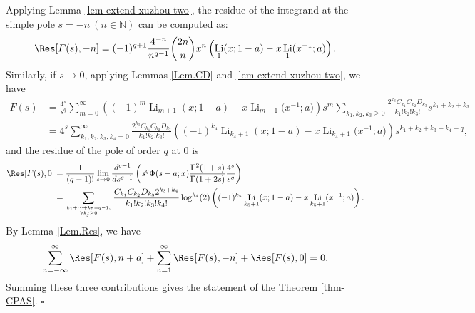 \documentclass[11pt]{article}
\DeclareMathOperator{\Li}{Li}
\def\N{\mathbb{N}}
\theoremstyle{plain}
\theoremstyle{definition}
\begin{document}
Applying Lemma \ref{lem-extend-xuzhou-two}, the residue of the integrand at the simple pole $s=-n\ (n\in\N)$ can be computed as:
\begin{align*}
\Res[F(s),-n]=(-1)^{q+1}\frac{4^{-n}}{n^{q-1}}\binom{2n}{n}x^n\left(\Li_1(x;1-a)-x\Li_1(x^{-1};a)\right).
\end{align*}
Similarly, if $s\to 0$, applying Lemmas \ref{Lem.CD} and \ref{lem-extend-xuzhou-two}, we have
\begin{align*}
F(s)&=\frac{4^s}{s^q}\sum_{m=0}^\infty \left((-1)^m \Li_{m+1}(x;1-a)-x \Li_{m+1}\Big(x^{-1};a\Big) \right)s^m \sum_{k_1,k_2,k_3\geq0}
    \frac{2^{k_3}C_{k_1}C_{k_2}D_{k_3}}{k_1!k_2!k_3!}s^{k_1+k_2+k_3}\\
    &=4^s\sum_{k_1,k_2,k_3,k_4=0}^\infty \frac{2^{k_3}C_{k_1}C_{k_2}D_{k_3}}{k_1!k_2!k_3!}\left((-1)^{k_4} \Li_{k_4+1}(x;1-a)-x \Li_{k_4+1}\Big(x^{-1};a\Big) \right)s^{k_1+k_2+k_3+k_4-q},
\end{align*}
and the residue of the pole of order $q$ at 0 is
\begin{align*}
\Res[F(s),0]&=\frac1{(q-1)!}\lim_{s\rightarrow 0}\frac{d^{q-1}}{ds^{q-1}}\left(s^q\Phi(s-a;x) \frac{\Gamma^2(1+s)}{\Gamma(1+2s)}\frac{4^s}{s^q}\right)\\
&=\sum_{k_1+\cdots+k_5=q-1,\atop \forall k_j\geq 0} \frac{C_{k_1}C_{k_2}D_{k_3}2^{k_3+k_4}}{k_1!k_2!k_3!k_4!}\log^{k_4}(2)\left((-1)^{k_5}\Li_{k_5+1}(x;1-a)-x\Li_{k_5+1}(x^{-1};a)\right).
\end{align*}
By Lemma \ref{Lem.Res}, we have
\begin{align*}
\sum_{n=-\infty}^\infty \Res[F(s),n+a]+\sum_{n=1}^\infty \Res[F(s),-n]+\Res[F(s),0]=0.
\end{align*}
Summing these three contributions gives the statement of the Theorem \ref{thm-CPAS}. \hfill $\square$
\end{document}
